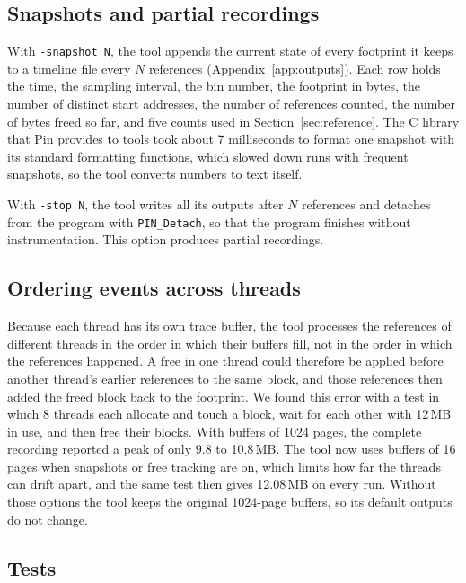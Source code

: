\documentclass[11pt]{article}
\newcommand{\knob}[1]{\texttt{-#1}}
\newcommand{\secref}[1]{Section~\ref{#1}}
\begin{document}
\subsection{Snapshots and partial recordings}
\label{sec:snapshots}

With \knob{snapshot N}, the tool appends the current state of every footprint it keeps to a timeline file every $N$ references (Appendix~\ref{app:outputs}). Each row holds the time, the sampling interval, the bin number, the footprint in bytes, the number of distinct start addresses, the number of references counted, the number of bytes freed so far, and five counts used in \secref{sec:reference}. The C library that Pin provides to tools took about 7 milliseconds to format one snapshot with its standard formatting functions, which slowed down runs with frequent snapshots, so the tool converts numbers to text itself.

With \knob{stop N}, the tool writes all its outputs after $N$ references and detaches from the program with \texttt{PIN\_Detach}, so that the program finishes without instrumentation. This option produces partial recordings.

\subsection{Ordering events across threads}
\label{sec:ordering}

Because each thread has its own trace buffer, the tool processes the references of different threads in the order in which their buffers fill, not in the order in which the references happened. A free in one thread could therefore be applied before another thread's earlier references to the same block, and those references then added the freed block back to the footprint. We found this error with a test in which 8 threads each allocate and touch a block, wait for each other with 12\,MB in use, and then free their blocks. With buffers of 1024 pages, the complete recording reported a peak of only 9.8 to 10.8\,MB. The tool now uses buffers of 16 pages when snapshots or free tracking are on, which limits how far the threads can drift apart, and the same test then gives 12.08\,MB on every run. Without those options the tool keeps the original 1024-page buffers, so its default outputs do not change.

\subsection{Tests}
\label{sec:tests}
\end{document}
